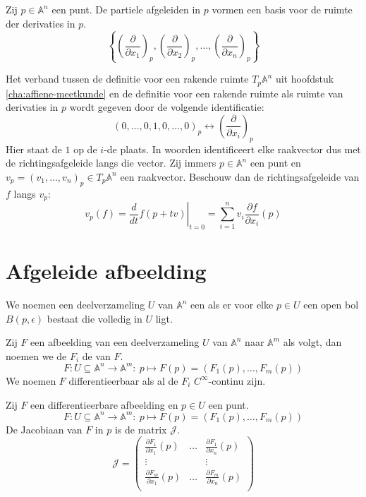 \documentclass[main.tex]{subfiles}
\begin{document}
\begin{st}
  Zij $p\in\mathbb{A}^{n}$ een punt.
  De partiele afgeleiden in $p$ vormen een basis voor de ruimte der derivaties in $p$.
  \[ \left\{ \left(\frac{\partial}{\partial x_{1}}\right)_{p}, \left(\frac{\partial}{\partial x_{2}}\right)_{p}, \dotsc , \left(\frac{\partial}{\partial x_{n}}\right)_{p}\right\}  \]
\end{st}

\begin{opm}
  Het verband tussen de definitie voor een rakende ruimte $T_{p}\mathbb{A}^{n}$ uit hoofdstuk \ref{cha:affiene-meetkunde} en de definitie voor een rakende ruimte als ruimte van derivaties in $p$ wordt gegeven door de volgende identificatie:
  \[ 
  (0,\dotsc,0,1,0,\dotsc,0)_{p}
  \leftrightarrow
  \left(\frac{\partial}{\partial x_{i}}\right)_{p}
  \]
  Hier staat de $1$ op de $i$-de plaats.
  In woorden identificeert elke raakvector dus met de richtingsafgeleide langs die vector.
  Zij immers $p\in\mathbb{A}^{n}$ een punt en $v_{p} = (v_{1},\dotsc,v_{n})_{p} \in T_{p}\mathbb{A}^{n}$ een raakvector.
  Beschouw dan de richtingsafgeleide van $f$ langs $v_{p}$:
  \[ v_{p}(f) = \left.\frac{d}{dt}f(p+tv)\right|_{t=0} = \sum_{i=1}^{n}v_{i}\frac{\partial f}{\partial x_{i}}(p)\]
\end{opm}

\section{Afgeleide afbeelding}
\label{sec:afgeleide-afbeelding}

\begin{de}
  We noemen een deelverzameling $U$ van $\mathbb{A}^{n}$ een  als er voor elke $p\in U$ een open bol $B(p,\epsilon)$ bestaat die volledig in $U$ ligt.
\end{de}

\begin{de}
  Zij $F$ een afbeelding van een deelverzameling $U$ van $\mathbb{A}^{n}$ naar $\mathbb{A}^{m}$ als volgt, dan noemen we de $F_{i}$ de  van $F$.
  \[ F: U\subseteq \mathbb{A}^{n} \rightarrow \mathbb{A}^{m}:\ p\mapsto F(p) = (F_{1}(p),\dotsc,F_{m}(p)) \]  
  We noemen $F$ differentieerbaar als al de $F_{i}$ $C^{\infty}$-continu zijn. 
\end{de}

\begin{de}
  Zij $F$ een differentieerbare afbeelding en $p \in U$ een punt.
  \[ F: U\subseteq \mathbb{A}^{n} \rightarrow \mathbb{A}^{m}:\ p\mapsto F(p) = (F_{1}(p),\dotsc,F_{m}(p)) \]
  De Jacobiaan van $F$ in $p$ is de matrix $\mathcal{J}$.
  \[
  \mathcal{J} = 
  \begin{pmatrix}
  \frac{\partial F_{1}}{\partial x_{1}}(p) & \hdots & \frac{\partial F_{1}}{\partial x_{n}}(p)\\
  \vdots & & \vdots\\
  \frac{\partial F_{m}}{\partial x_{1}}(p) & \hdots & \frac{\partial F_{m}}{\partial x_{n}}(p)\\
  \end{pmatrix}
  \]  
\end{de}
\end{document}
